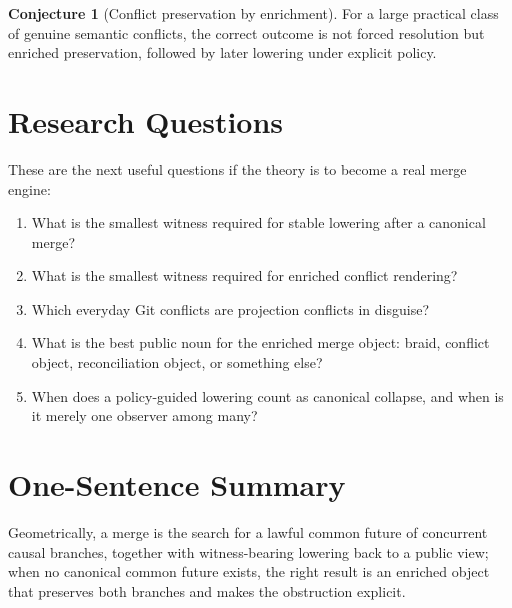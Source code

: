 \documentclass[11pt]{article}
\theoremstyle{definition}
\newtheorem{conjecture}{Conjecture}
\begin{document}
\begin{conjecture}[Conflict preservation by enrichment]
For a large practical class of genuine semantic conflicts, the correct outcome
is not forced resolution but enriched preservation, followed by later lowering
under explicit policy.
\end{conjecture}

\section{Research Questions}

These are the next useful questions if the theory is to become a real merge
engine:
\begin{enumerate}[leftmargin=2em]
\item What is the smallest witness required for stable lowering after a
  canonical merge?
\item What is the smallest witness required for enriched conflict rendering?
\item Which everyday Git conflicts are projection conflicts in disguise?
\item What is the best public noun for the enriched merge object:
  braid, conflict object, reconciliation object, or something else?
\item When does a policy-guided lowering count as canonical collapse, and when
  is it merely one observer among many?
\end{enumerate}

\section{One-Sentence Summary}

Geometrically, a merge is the search for a lawful common future of concurrent
causal branches, together with witness-bearing lowering back to a public view;
when no canonical common future exists, the right result is an enriched object
that preserves both branches and makes the obstruction explicit.
\end{document}

